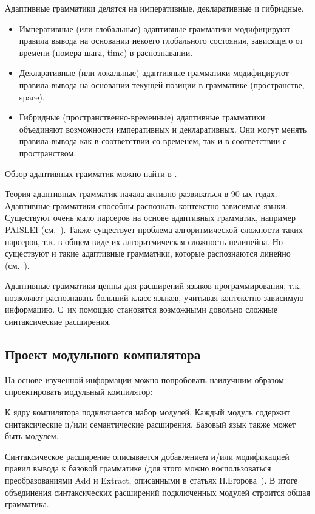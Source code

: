 \documentclass[a4paper,12pt,titlepage]{extarticle}
\begin{document}
Адаптивные грамматики делятся на императивные, декларативные и гибридные.
\begin{itemize}
  \item Императивные (или глобальные) адаптивные грамматики модифицируют правила
  вывода на основании некоего глобального состояния, зависящего от времени
  (номера шага, time) в распознавании.
  \item Декларативные (или локальные) адаптивные грамматики модифицируют правила
  вывода на основании текущей позиции в грамматике (пространстве, space).
  \item Гибридные (пространственно-временные) адаптивные грамматики объединяют
  возможности императивных и декларативных. Они могут менять правила вывода как
  в соответствии со временем, так и в соответствии с пространством.
\end{itemize}
Обзор адаптивных грамматик можно найти в \cite{adaptive}.

Теория адаптивных грамматик начала активно развиваться в 90-ых годах.
Адаптивные грамматики способны распознать контекстно-зависимые языки.
Существуют очень мало парсеров на основе адаптивных грамматик, например PAISLEI
(см.~\cite{paislei}). Также существует проблема алгоритмической сложности таких
парсеров, т.к. в общем виде их алгоритмическая сложность нелинейна. Но
существуют и такие адаптивные грамматики, которые распознаются линейно
(см.~\cite{paislei}).

Адаптивные грамматики ценны для расширений языков программирования, т.к.
позволяют распознавать больший класс языков, учитывая контекстно-зависимую
информацию. С~их помощью становятся возможными довольно сложные синтаксические
расширения.

\subsection{Проект модульного компилятора}
На основе изученной информации можно попробовать наилучшим образом
спроектировать модульный компилятор:

К ядру компилятора подключается набор модулей. Каждый модуль содержит
синтаксические и/или семантические расширения. Базовый язык также может быть
модулем.

Синтаксическое расширение описывается добавлением и/или модификацией правил
вывода к базовой грамматике (для этого можно воспользоваться преобразованиями
Add и Extract, описанными в статьях П.Егорова~\cite{Egor}). В итоге объединения
синтаксических расширений подключенных модулей строится общая грамматика.
\end{document}
